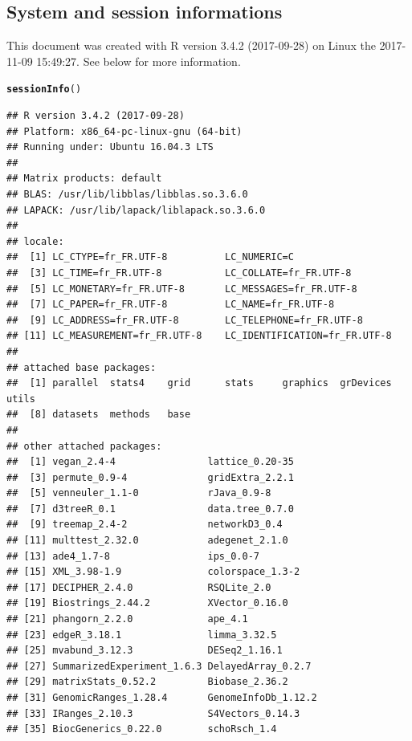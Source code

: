 \documentclass[12pt]{article}\usepackage[]{graphicx}\usepackage[]{color}
\makeatletter
\newcommand{\hlstd}[1]{\textcolor[rgb]{0.345,0.345,0.345}{#1}}%
\newcommand{\hlkwd}[1]{\textcolor[rgb]{0.737,0.353,0.396}{\textbf{#1}}}%
\newenvironment{kframe}{%
 \def\at@end@of@kframe{}%
 \ifinner\ifhmode%
  \def\at@end@of@kframe{\end{minipage}}%
  \begin{minipage}{\columnwidth}%
 \fi\fi%
 \def\FrameCommand##1{\hskip\@totalleftmargin \hskip-\fboxsep
 \colorbox{shadecolor}{##1}\hskip-\fboxsep
     \hskip-\linewidth \hskip-\@totalleftmargin \hskip\columnwidth}%
 \MakeFramed {\advance\hsize-\width
   \@totalleftmargin\z@ \linewidth\hsize
   \@setminipage}}%
 {\par\unskip\endMakeFramed%
 \at@end@of@kframe}
\newenvironment{knitrout}{}{} %
\numberwithin{figure}{section}
\makeatother
\begin{document}
  \subsection{System and session informations}
  This document was created with R version 3.4.2 (2017-09-28) on Linux the 2017-11-09 15:49:27. See below for more information.
\begin{knitrout}\tiny
{}\color{fgcolor}\begin{kframe}
\begin{alltt}
\hlkwd{sessionInfo}\hlstd{()}
\end{alltt}
\begin{verbatim}
## R version 3.4.2 (2017-09-28)
## Platform: x86_64-pc-linux-gnu (64-bit)
## Running under: Ubuntu 16.04.3 LTS
## 
## Matrix products: default
## BLAS: /usr/lib/libblas/libblas.so.3.6.0
## LAPACK: /usr/lib/lapack/liblapack.so.3.6.0
## 
## locale:
##  [1] LC_CTYPE=fr_FR.UTF-8          LC_NUMERIC=C                 
##  [3] LC_TIME=fr_FR.UTF-8           LC_COLLATE=fr_FR.UTF-8       
##  [5] LC_MONETARY=fr_FR.UTF-8       LC_MESSAGES=fr_FR.UTF-8      
##  [7] LC_PAPER=fr_FR.UTF-8          LC_NAME=fr_FR.UTF-8          
##  [9] LC_ADDRESS=fr_FR.UTF-8        LC_TELEPHONE=fr_FR.UTF-8     
## [11] LC_MEASUREMENT=fr_FR.UTF-8    LC_IDENTIFICATION=fr_FR.UTF-8
## 
## attached base packages:
##  [1] parallel  stats4    grid      stats     graphics  grDevices utils    
##  [8] datasets  methods   base     
## 
## other attached packages:
##  [1] vegan_2.4-4                lattice_0.20-35           
##  [3] permute_0.9-4              gridExtra_2.2.1           
##  [5] venneuler_1.1-0            rJava_0.9-8               
##  [7] d3treeR_0.1                data.tree_0.7.0           
##  [9] treemap_2.4-2              networkD3_0.4             
## [11] multtest_2.32.0            adegenet_2.1.0            
## [13] ade4_1.7-8                 ips_0.0-7                 
## [15] XML_3.98-1.9               colorspace_1.3-2          
## [17] DECIPHER_2.4.0             RSQLite_2.0               
## [19] Biostrings_2.44.2          XVector_0.16.0            
## [21] phangorn_2.2.0             ape_4.1                   
## [23] edgeR_3.18.1               limma_3.32.5              
## [25] mvabund_3.12.3             DESeq2_1.16.1             
## [27] SummarizedExperiment_1.6.3 DelayedArray_0.2.7        
## [29] matrixStats_0.52.2         Biobase_2.36.2            
## [31] GenomicRanges_1.28.4       GenomeInfoDb_1.12.2       
## [33] IRanges_2.10.3             S4Vectors_0.14.3          
## [35] BiocGenerics_0.22.0        schoRsch_1.4              

\end{verbatim}
\end{kframe}
\end{knitrout}
\end{document}
